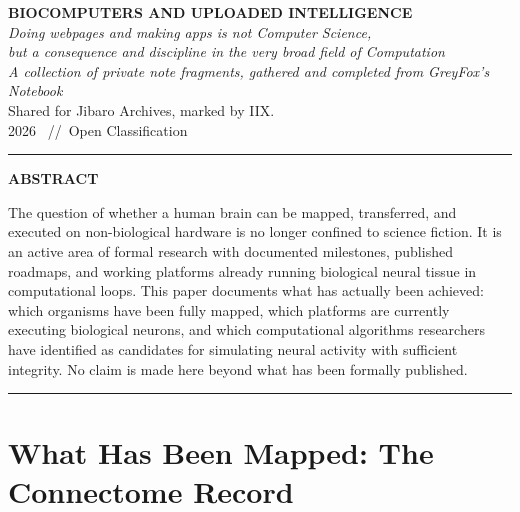 \documentclass[11pt,a4paper]{article}
\begin{document}
\begin{center}
{\LARGE\bfseries BIOCOMPUTERS AND UPLOADED INTELLIGENCE}\\[1.0em]
{\itshape\large Doing webpages and making apps is not Computer Science,\\
but a consequence and discipline in the very broad field of Computation}\\[1.2em]
{\itshape A collection of private note fragments, gathered and completed from GreyFox's Notebook}\\[0.3em]
Shared for Jibaro Archives, marked by IIX.\\[0.2em]
{\small\color{gray!60!black} 2026 \ //\ Open Classification}
\end{center}

\vspace{0.5em}
\noindent\rule{\textwidth}{1.2pt}
\vspace{0.4em}

\begin{center}
\textbf{\large ABSTRACT}
\end{center}

The question of whether a human brain can be mapped, transferred, and executed on non-biological hardware is no longer confined to science fiction. It is an active area of formal research with documented milestones, published roadmaps, and working platforms already running biological neural tissue in computational loops. This paper documents what has actually been achieved: which organisms have been fully mapped, which platforms are currently executing biological neurons, and which computational algorithms researchers have identified as candidates for simulating neural activity with sufficient integrity. No claim is made here beyond what has been formally published.

\vspace{0.4em}
\noindent\rule{\textwidth}{0.4pt}

\section{What Has Been Mapped: The Connectome Record}
\end{document}
